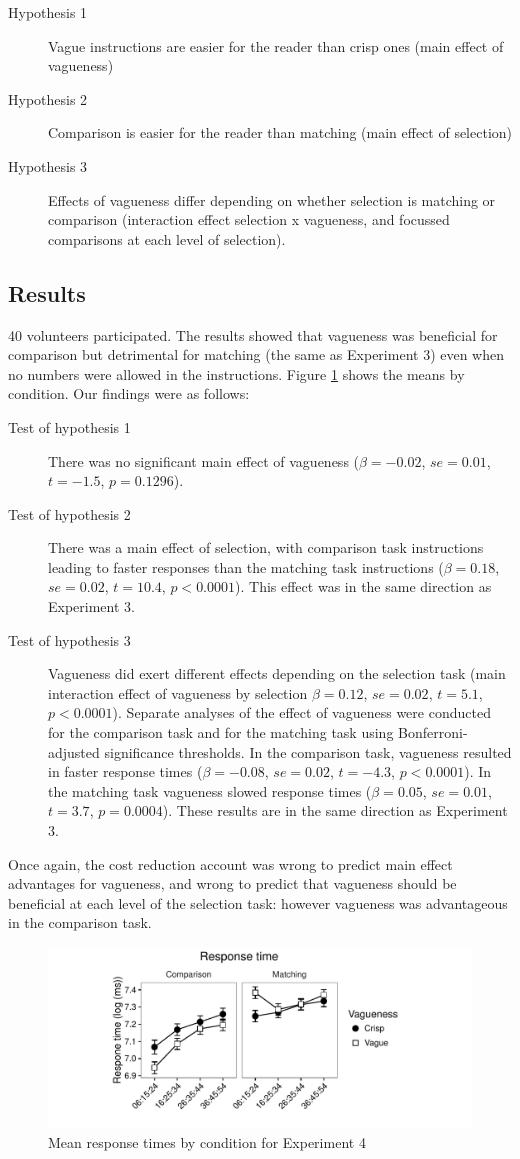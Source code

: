 \begin{description}
	\item [Hypothesis 1] Vague instructions are easier for the reader than crisp ones (main effect of vagueness)
	\item [Hypothesis 2] Comparison is easier for the reader than matching (main effect of selection)
	\item [Hypothesis 3] Effects of vagueness differ depending on whether selection is matching or comparison (interaction effect selection x vagueness, and focussed comparisons at each level of selection).
\end{description}

\subsection{Results}%
40 volunteers participated.
The results showed that vagueness was beneficial for comparison but detrimental for matching (the same as Experiment 3) even when no numbers were allowed in the instructions. 
Figure \ref{resultse4} shows the means by condition. Our findings were as follows:

\begin{description}
	\item [Test of hypothesis 1] There was no significant main effect of vagueness ($\beta=-0.02$, $se=0.01$, $t=-1.5$, $p=0.1296$). 
	\item [Test of hypothesis 2] There was a main effect of selection, with comparison task instructions leading to faster responses than the matching task instructions ($\beta=0.18$, $se=0.02$, $t=10.4$, $p<0.0001$).  This effect was in the same direction as Experiment 3. 
	\item [Test of hypothesis 3] Vagueness did exert different effects depending on the selection task (main interaction effect of vagueness by selection $\beta=0.12$, $se=0.02$, $t=5.1$, $p<0.0001$). 
Separate analyses of the effect of vagueness were conducted for the comparison task and for the matching task using Bonferroni-adjusted significance thresholds. 
In the comparison task, vagueness resulted in faster response times ($\beta=-0.08$, $se=0.02$, $t=-4.3$, $p<0.0001$). 
In the matching task vagueness slowed response times ($\beta=0.05$, $se=0.01$, $t=3.7$, $p=0.0004$). 
These results are in the same direction as Experiment 3.
\end{description}

Once again, the cost reduction account was wrong to predict main effect advantages for vagueness, and wrong to predict that vagueness should be beneficial at each level of the selection task: however vagueness was advantageous in the comparison task.

\begin{figure}[htbp]
\centering
\includegraphics[width=\textwidth]{figures/e4-rtplot-1.pdf}
\caption{Mean response times by condition for Experiment 4}
\label{resultse4}
\end{figure}
